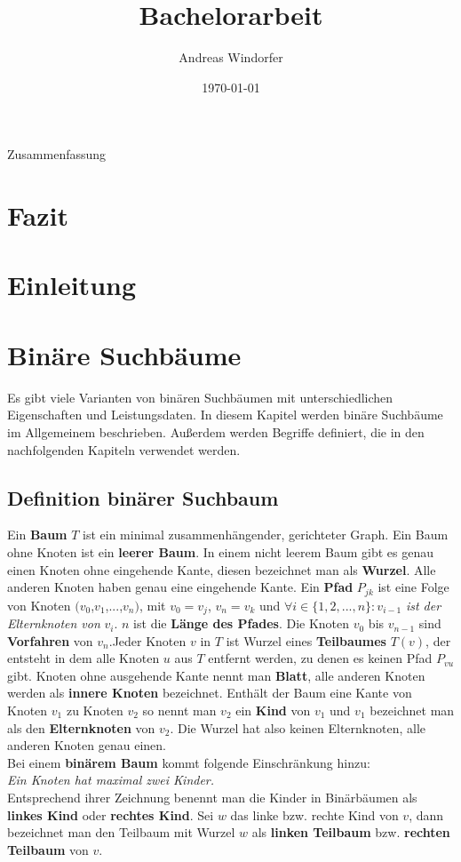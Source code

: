 \documentclass[a4paper,12pt]{article}
\title{Bachelorarbeit}
\author{
	Andreas Windorfer\\
}
\date{\today}
\begin{document}
\maketitle
\newpage
Zusammenfassung
\newpage
\tableofcontents
\section{Fazit}
\newpage
\section{Einleitung}
\newpage
\section {Binäre Suchbäume}
Es gibt viele Varianten von binären Suchbäumen mit unterschiedlichen Eigenschaften und Leistungsdaten. In diesem Kapitel werden binäre Suchbäume im Allgemeinem beschrieben. Außerdem werden Begriffe definiert, die in den nachfolgenden Kapiteln verwendet werden. \\
\subsection{Definition binärer Suchbaum}
Ein \textbf{Baum} $T$ ist ein minimal zusammenhängender, gerichteter Graph. Ein Baum ohne Knoten ist ein \textbf{leerer Baum}. In einem nicht leerem Baum gibt es genau einen Knoten ohne eingehende Kante, diesen bezeichnet man als \textbf{Wurzel}. Alle anderen Knoten haben genau eine eingehende Kante.  Ein \textbf{Pfad} $P_{jk}$ ist eine Folge von Knoten $(v_0$,$v_1$,...,$v_n)$, mit $v_0 = v_j$, $v_n = v_k$ und $\forall i \in \{ 1, 2,..., n \} \colon v_{i-1}$ \textit{ist der Elternknoten von} $v_i$. $n$ ist die \textbf{Länge des Pfades}. Die Knoten  $v_0$ bis $v_{n-1}$ sind \textbf{Vorfahren} von $v_n$.Jeder Knoten $v$ in $T$ ist Wurzel eines \textbf{Teilbaumes} $T(v)$, der entsteht in dem alle Knoten $u$ aus $T$ entfernt werden, zu denen es keinen Pfad $P_{vu}$ gibt.  Knoten ohne ausgehende Kante nennt man \textbf{Blatt}, alle anderen Knoten werden als \textbf{innere Knoten} bezeichnet. Enthält der Baum eine Kante von Knoten $v_1$ zu Knoten $v_2$ so nennt man $v_2$ ein \textbf{Kind} von $v_1$ und $v_1$ bezeichnet man als den  \textbf{Elternknoten} von $v_2$. Die Wurzel hat also keinen Elternknoten, alle anderen Knoten genau einen.\\
Bei einem \textbf{binärem Baum} kommt folgende Einschränkung hinzu:  \\
\textit{Ein Knoten hat maximal zwei Kinder.}\\ 
Entsprechend ihrer Zeichnung benennt man die Kinder in Binärbäumen als \textbf{linkes Kind} oder \textbf{rechtes Kind}. Sei $w$ das linke bzw. rechte Kind von $v$, dann bezeichnet man den Teilbaum mit Wurzel $w$ als \textbf{linken Teilbaum} bzw. \textbf{rechten Teilbaum}  von $v$.  
\end{document}

